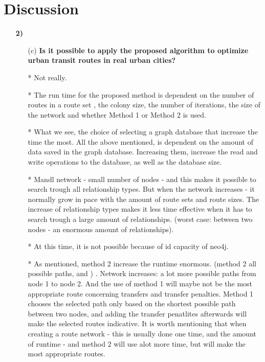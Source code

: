\section{Discussion}

\begin{enumerate}[label=\textbf{\arabic*})]
\item[\textbf{2)}]
    \begin{enumerate}

    \item[(c)]  \textbf{Is it possible to apply the proposed algorithm to optimize urban transit routes in real urban cities?}

    * Not really.

    * The run time for the proposed method is dependent on the number of routes in a route set , the colony size, the number of iterations, the size of the network and whether Method 1 or Method 2 is used. 

    * What we see, the choice of selecting a graph database that increase the time the most. All the above mentioned, is dependent on the amount of data saved in the graph database. Increasing them, increase the read and write operations to the database, as well as the database size.

    * Mandl network - small number of nodes - and this makes it possible to search trough all relationship types. But when the network increases - it normally grow in pace with the amount of route sets and route sizes.
    The increase of relationship types makes it less time effective when it has to search trough a large amount of relationships.  (worst case: between two nodes - an enormous amount of relationships).

    * At this time, it is not possible because of id capacity of neo4j. 

     * As mentioned, method 2 increase the runtime enormous. (method 2 all possible paths, and ) . Network increases: a lot more possible paths from node 1 to node 2. And the use of method 1 will maybe not be the most appropriate route concerning transfers and transfer penalties. Method 1 chooses the selected path only based on the shortest possible path between two nodes, and adding the transfer penatlites afterwards will make the selected routes indicative. It is worth mentioning that when creating a route network - this is usually done one time, and the amount of runtime - and method 2 will use alot more time, but will make the most appropriate routes. 


\end{enumerate}
\end{enumerate}
